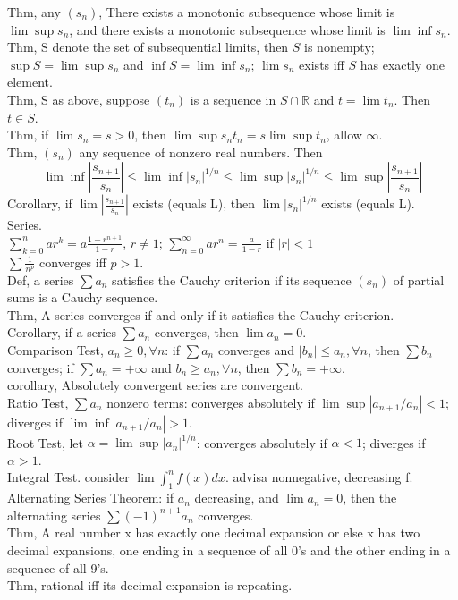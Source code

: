 \documentclass[paper=a4, fontsize=11pt]{scrartcl} %
\numberwithin{equation}{section} %
\numberwithin{figure}{section} %
\numberwithin{table}{section} %
\begin{document}
Thm, any $(s_n)$, There exists a monotonic subsequence whose limit is $\lim\sup s_n$, and there exists a monotonic subsequence whose limit is $\lim\inf s_n$.\\
Thm, S denote the set of subsequential limits, then $S$ is nonempty; $\sup S=\lim\sup s_n$ and $\inf S=\lim\inf s_n$; $\lim s_n$ exists iff $S$ has exactly one element.\\
Thm, S as above, suppose $(t_n)$ is a sequence in $S\cap \mathbb{R}$ and $t=\lim t_n$. Then $t\in S$.\\
Thm, if $\lim s_n=s>0$, then $\lim\sup s_nt_n = s\lim\sup t_n$, allow $\infty$.\\
Thm, $(s_n)$ any sequence of nonzero real numbers. Then
\begin{equation}
\lim\inf|\frac{s_{n+1}}{s_n}| \leq \lim\inf |s_n|^{1/n} \leq \lim\sup |s_n|^{1/n} \leq \lim\sup |\frac{s_{n+1}}{s_n}|
\end{equation}
Corollary, if $\lim |\frac{s_{n+1}}{s_n}|$ exists (equals L), then $\lim|s_n|^{1/n}$ exists (equals L).\\
Series.\\
$\sum_{k=0}^n ar^k = a\frac{1-r^{n+1}}{1-r}$, $r\neq 1$; $\sum_{n=0}^\infty ar^n = \frac{a}{1-r}$ if $|r|<1$\\
$\sum \frac{1}{n^p}$ converges iff $p>1$.\\
Def, a series $\sum a_n$ satisfies the Cauchy criterion if its sequence $(s_n)$ of partial sums is a Cauchy sequence.\\
Thm, A series converges if and only if it satisfies the Cauchy criterion.\\
Corollary, if a series $\sum a_n$ converges, then $\lim a_n = 0$.\\
Comparison Test, $a_n\geq 0, \forall n$: if $\sum a_n$ converges and $|b_n|\leq a_n,\forall n$, then $\sum b_n$ converges; if $\sum a_n = +\infty$ and $b_n\geq a_n, \forall n$, then $\sum b_n=+\infty$.\\
corollary, Absolutely convergent series are convergent.\\
Ratio Test, $\sum a_n$ nonzero terms: converges absolutely if $\lim\sup|a_{n+1}/a_n|<1$; diverges if $\lim\inf|a_{n+1}/a_n|>1$.\\
Root Test, let $\alpha = \lim\sup |a_n|^{1/n}$: converges absolutely if $\alpha<1$; diverges if $\alpha >1$.\\
Integral Test.
consider $\lim \int_1^n f(x)dx$. advisa nonnegative, decreasing f.\\
Alternating Series Theorem: if $a_n$ decreasing, and $\lim a_n=0$, then the alternating series $\sum (-1)^{n+1} a_n$ converges.\\
Thm, A real number x has exactly one decimal expansion or else x has two decimal expansions, one ending in a sequence of all 0's and the other ending in a sequence of all 9's.\\
Thm, rational iff its decimal expansion is repeating.
\end{document}
